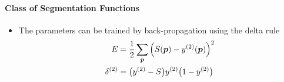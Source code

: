 \paragraph{Class of Segmentation Functions}
\begin{itemize}
\item The parameters can be trained by back-propagation using the delta rule
\begin{align}
E &= \frac{1}{2}\sum_{\vect{p}}\left(S(\vect{p}) - y^{(2)}(\vect{p})\right)^2
\\
\delta^{(2)} &= \big(y^{(2)} -S\big)y^{(2)}\big(1-y^{(2)}\big)

\end{align}
\end{itemize}

